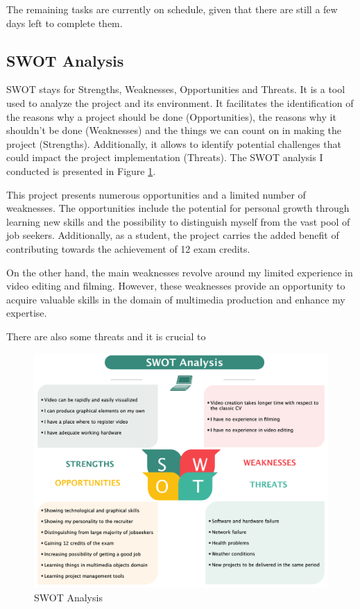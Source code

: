 \documentclass{article}
\begin{document}
\begin{multicols}{2}
    The remaining tasks are currently on schedule, given that there are still a few days left to complete them.

   

    \clearpage
    \subsection{SWOT Analysis}
    SWOT stays for Strengths, Weaknesses, Opportunities and Threats. It is a tool used to analyze the project and its environment. It facilitates the identification 
    of the reasons why a project should be done (Opportunities), the reasons why it shouldn't be done (Weaknesses) and the things we can count on in making
    the project (Strengths). 
    Additionally, it allows to identify potential challenges that could impact the project implementation (Threats). 
    The SWOT analysis I conducted is presented in Figure \ref{fig:swot}.

   
    This project presents numerous opportunities and a limited number of weaknesses. The opportunities include the potential for personal growth through learning new skills 
    and the possibility to distinguish myself from the vast pool of job seekers. Additionally, as a student, the project carries the added benefit of contributing towards the 
    achievement of 12 exam credits.

    On the other hand, the main weaknesses revolve around my limited experience in video editing and filming. However, these weaknesses provide an opportunity to acquire 
    valuable skills in the domain of multimedia production and enhance my expertise.

    There are also some threats and it is crucial to
    \begin{figure}[H]
        \centering
        \includegraphics[width=1\textwidth]{SWOT.png}
        \caption{SWOT Analysis}
        \label{fig:swot}
    \end{figure}


\end{multicols}
\end{document}
